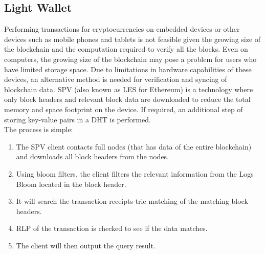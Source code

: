 \documentclass[a4paper,12pt]{article}
\begin{document}
{	\subsection{Light Wallet}
	{\par \noindent
		Performing transactions for cryptocurrencies on embedded devices or other devices such as mobile phones and tablets is not feasible given the growing size of the blockchain and the computation required to verify all the blocks. Even on computers, the growing size of the blockchain may pose a problem for users who have limited storage space. Due to limitations in hardware capabilities of these devices, an alternative method is needed for verification and syncing of blockchain data. \ac{SPV} (also known as \ac{LES} for Ethereum) is a technology where only block headers and relevant block data are downloaded to reduce the total memory and space footprint on the device. If required, an additional step of storing key-value pairs in a \ac{DHT} is performed.\\\newline
	The process is simple:
\begin{enumerate}
	\item The \ac{SPV} client contacts full nodes (that has data of the entire blockchain) and downloads all block headers from the nodes.
	\item Using bloom filters, the client filters the relevant information from the Logs Bloom located in the block header.
	\item It will search the transaction receipts trie matching of the matching block headers.
	\item \ac{RLP} of the transaction is checked to see if the data matches.
	\item The client will then output the query result.
\end{enumerate}}
}
\end{document}

